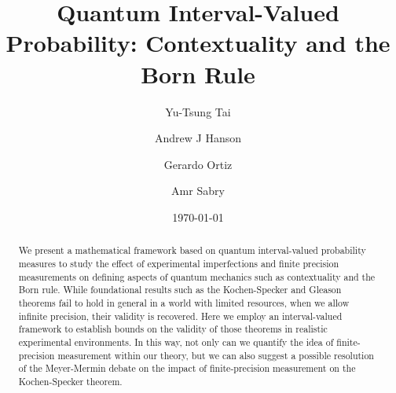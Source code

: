 \documentclass[english,reprint, aps, prl,superscriptaddress, showpacs,
showkeys, longbibliography, amsmath, amssymb, floatfix]{revtex4-1}
\theoremstyle{plain}
\theoremstyle{definition}
\newcommand{\andy}[1]{\fbox{\begin{minipage}{0.9\linewidth}\color{blue}{Andy says: #1}\end{minipage}}}
\begin{document}
\title{Quantum Interval-Valued Probability: Contextuality and the Born Rule}

\author{Yu-Tsung Tai}

\author{Andrew J Hanson}

\author{Gerardo Ortiz}

\author{Amr Sabry}

\date{\today}

\begin{abstract}
We present a mathematical framework based on quantum interval-valued
probability measures to study the effect of experimental imperfections
and finite precision measurements on defining aspects of quantum
mechanics such as contextuality and the Born rule. While foundational
results such as the Kochen-Specker and Gleason theorems fail to hold
in general in a world with limited resources, when we allow infinite
precision, their validity is recovered. \andy{<reverse this?> are valid in the
context of infinite precision, they fail to hold in general in a world with
limited resources.} Here we employ an
interval-valued framework to establish bounds on the validity of
those theorems in realistic experimental environments. In this way,
not only can we quantify the idea of finite-precision measurement
within our theory, but we can also suggest a possible resolution of
the Meyer-Mermin debate on the impact of finite-precision measurement
on the Kochen-Specker theorem.
\end{abstract}



\maketitle
\end{document}

